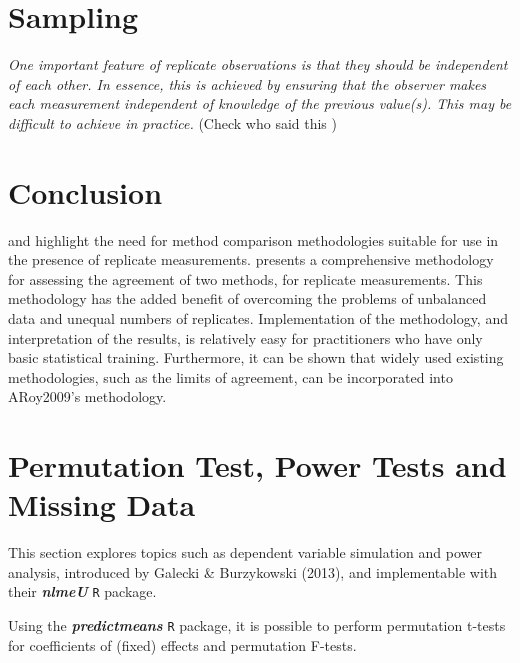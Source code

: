 \documentclass[12pt, a4paper]{report}
\theoremstyle{plain}
\theoremstyle{definition}
\theoremstyle{remark}
\begin{document}
	
	

	\section{Sampling}
	\emph{
		One important feature of replicate observations is that they should be independent
		of each other. In essence, this is achieved by ensuring that the observer makes each
		measurement independent of knowledge of the previous value(s). This may be difficult
		to achieve in practice.} (Check who said this
	)
	
	
	
	
	
	
	
	\section{Conclusion}
	\citet{BXC2008} and \citet{ARoy2009} highlight the need for method comparison methodologies suitable for use in the presence of replicate measurements. \citet{ARoy2009} presents a comprehensive methodology for assessing the agreement of two methods, for replicate measurements. This methodology has the added benefit of overcoming the problems of unbalanced data and unequal numbers of replicates. Implementation of the methodology, and interpretation of the results, is relatively easy for practitioners who have only basic statistical training. Furthermore, it can be shown that widely used existing methodologies, such as the limits of agreement, can be incorporated into ARoy2009's methodology.
	
	\section*{Permutation Test, Power Tests and Missing Data }
	
	This section explores topics such as dependent variable simulation and power analysis, introduced by Galecki \& Burzykowski (2013), and implementable with their \textbf{\textit{nlmeU}} \texttt{R} package.
	
	Using the \textbf{\textit{predictmeans}} \texttt{R} package, it is possible to perform permutation t-tests for coefficients of (fixed) effects and permutation F-tests.
	
\end{document}
